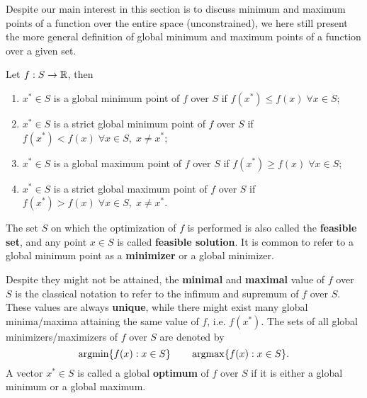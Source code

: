 \documentclass[10pt,a4paper]{article}
\begin{document}
Despite our main interest in this section is to discuss minimum and maximum points of a function over the entire space (unconstrained), we here still present the more general definition of global minimum and maximum points of a function over a given set. 
\begin{definition} 
	Let $f:S\to \mathbb{R}$, then
	\begin{enumerate}
		\item $x^* \in S$ is a global minimum point of $f$ over $S$ if $f(x^*)\leq f(x) \;\forall x \in S$;
		\item $x^* \in S$ is a strict global minimum point of $f$ over $S$ if $f(x^*)< f(x) \;\forall x \in S,\; x\neq x^*$;
		\item $x^* \in S$ is a global maximum point of $f$ over $S$ if $f(x^*)\geq f(x) \;\forall x \in S$;
		\item $x^* \in S$ is a strict global maximum point of $f$ over $S$ if $f(x^*)> f(x) \;\forall x \in S,\; x\neq x^*$.
	\end{enumerate}
\end{definition}
The set $S$ on which the optimization of $f$ is performed is also called the \textbf{feasible set}, and any point $x \in S$ is called \textbf{feasible solution}. It is common to refer to a global minimum point as a \textbf{minimizer} or a global minimizer.
\par Despite they might not be attained, the \textbf{minimal} and \textbf{maximal} value of $f$ over $S$ is the classical notation to refer to the infimum and supremum of $f$ over $S$. These values are always \textbf{unique}, while there might exist many global minima/maxima attaining the same value of $f$, i.e. $f(x^*)$. The sets of all global minimizers/maximizers of $f$ over $S$ are denoted by
\begin{equation*}
	\operatorname*{argmin} \{f(x): x\in S\}\qquad \operatorname*{argmax} \{f(x): x\in S\}.
\end{equation*}
A vector $x^* \in S$ is called a global \textbf{optimum} of $f$ over $S$ if it is either a global minimum or a global maximum.
\end{document}

